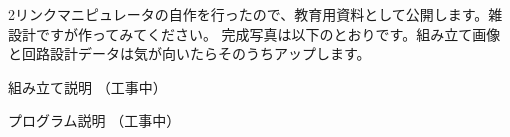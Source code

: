 2リンクマニピュレータの自作を行ったので、教育用資料として公開します。雑設計ですが作ってみてください。 完成写真は以下のとおりです。組み立て画像と回路設計データは気が向いたらそのうちアップします。   

組み立て説明 （工事中）

プログラム説明 （工事中） 